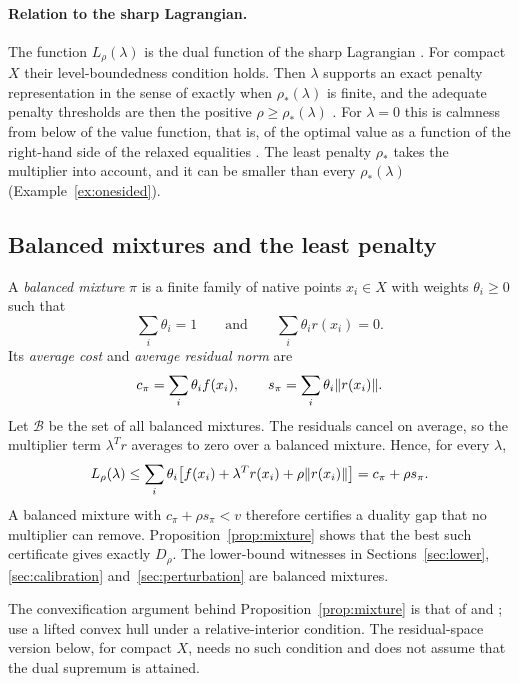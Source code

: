 \paragraph{Relation to the sharp Lagrangian.}
The function $L_\rho(\lambda)$ is the dual function of the sharp
Lagrangian \citep[Example~11.58]{RockafellarWets1998}. For compact $X$
their level-boundedness condition holds. Then $\lambda$ supports an
exact penalty representation in the sense of
\citet[Definition~11.60]{RockafellarWets1998} exactly when
$\rho_*(\lambda)$ is finite, and the adequate penalty thresholds are
then the positive $\rho\ge\rho_*(\lambda)$
\citep[Theorem~11.61]{RockafellarWets1998}. For $\lambda=0$ this is
calmness from below of the value function, that is, of the optimal value
as a function of the right-hand side of the relaxed equalities
\citep[Example~11.62(b)]{RockafellarWets1998}. The least penalty
$\rho_*$ takes the multiplier into account, and it can be smaller than
every $\rho_*(\lambda)$ (Example~\ref{ex:onesided}).

\subsection{Balanced mixtures and the least penalty}
A \emph{balanced mixture} $\pi$ is a finite family of native points
$x_i\in X$ with weights $\theta_i\ge0$ such that
\[
 \sum_i\theta_i=1\qquad\text{and}\qquad\sum_i\theta_ir(x_i)=0.
\]
Its \emph{average cost} and \emph{average residual norm} are
\[
 c_\pi=\sum_i\theta_if(x_i),\qquad
 s_\pi=\sum_i\theta_i\lVert r(x_i)\rVert.
\]
Let $\mathcal B$ be the set of all balanced mixtures. The residuals
cancel on average, so the multiplier term $\lambda^Tr$ averages to zero
over a balanced mixture. Hence, for every $\lambda$,
\[
 L_\rho(\lambda)\le\sum_i\theta_i
 \bigl[f(x_i)+\lambda^Tr(x_i)+\rho\lVert r(x_i)\rVert\bigr]=c_\pi+\rho s_\pi .
\]
A balanced mixture with $c_\pi+\rho s_\pi<v$ therefore certifies a
duality gap that no multiplier can remove. Proposition~\ref{prop:mixture}
shows that the best such certificate gives exactly $D_\rho$. The
lower-bound witnesses in Sections~\ref{sec:lower}, \ref{sec:calibration}
and~\ref{sec:perturbation} are balanced mixtures.

The convexification argument behind Proposition~\ref{prop:mixture} is
that of \citet{BolandEberhard2015} and \citet{FeizollahiAhmedSun2017};
\citet[Theorem~1]{FeizollahiAhmedSun2017} use a lifted convex hull under
a relative-interior condition. The residual-space version below, for
compact $X$, needs no such condition and does not assume that the dual
supremum is attained.

